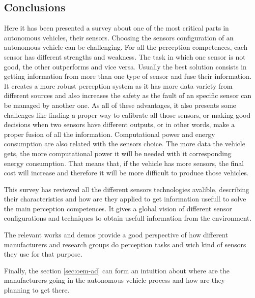\subsection{Conclusions}

Here it has been presented a survey about one of the most critical parts in autonomous vehicles, their sensors. Choosing the sensors configuration of an autonomous vehicle can be challenging. For all the perception competences, each sensor has different strengths and weakness. The task in which one sensor is not good, the other outperforms and vice versa. Usually the best solution consists in getting information from more than one type of sensor and fuse their information. It creates a more robust  perception system as it has more data variety from different sources and also increases the safety as the fault of an specific sensor can be managed by another one. As all of these advantages, it also presents some challenges like finding a proper way to calibrate all those sensors, or making good decisions when two sensors have different outputs, or in other words, make a proper fusion of all the information. Computational power and energy consumption are also related with the sensors choice. The more data the vehicle gets, the more computational power it will be needed with it corresponding energy consumption. That means that, if the vehicle has more sensors, the final cost will increase and therefore it will be more difficult  to produce those vehicles.

This survey has reviewed all the different sensors technologies avalible, describing their characteristics and how are they applied to get information usefull to solve the main perception competences. It gives a global vision of different sensor configurations and techniques to obtain usefull information from the environment.

The relevant works and demos provide a good perspective of how different manufacturers and research groups do perception tasks and wich kind of sensors they use for that purpose.

Finally, the section \ref{sec:oem-ad} can form an intuition about where are the 
manufacturers going in the autonomous vehicle process and how are they planning 
to get there.


